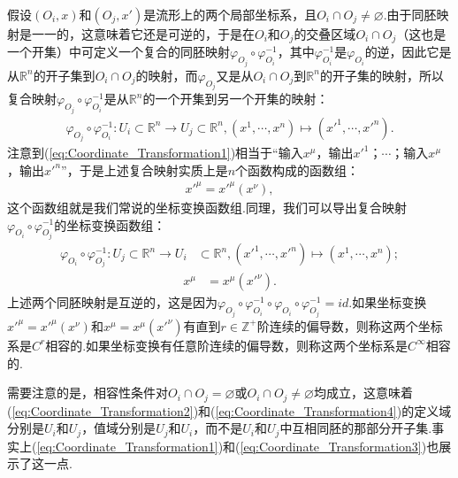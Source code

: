 	假设$(O_i,x)$和$(O_j,x')$是流形上的两个局部坐标系，且$O_i\cap O_j\neq \varnothing$.由于同胚映射是一一的，这意味着它还是可逆的，于是在$O_i$和$O_j$的交叠区域$O_i\cap O_j$（这也是一个开集）中可定义一个复合的同胚映射$\varphi_{O_j}\circ \varphi^{-1}_{O_i}$，其中$\varphi^{-1}_{O_i}$是$\varphi_{O_i}$的逆，因此它是从$\mathbb{R}^n$的开子集到$O_i\cap O_j$的映射，而$\varphi_{O_j}$又是从$O_i\cap O_j$到$\mathbb{R}^n$的开子集的映射，所以复合映射$\varphi_{O_j}\circ \varphi^{-1}_{O_i}$是从$\mathbb{R}^n$的一个开集到另一个开集的映射：
	\begin{equation}\label{eq:Coordinate_Transformation1}
		\begin{split}
			\varphi_{O_j}\circ \varphi^{-1}_{O_i}:U_i\subset\mathbb{R}^n\rightarrow U_j\subset\mathbb{R}^n,(x^1,\cdots,x^n)\mapsto (x'^1,\cdots,x'^n).
		\end{split}
	\end{equation}
	注意到(\ref{eq:Coordinate_Transformation1})相当于“输入$x^\mu$，输出$x'^1$；$\cdots$；输入$x^\mu$，输出$x'^n$”，于是上述复合映射实质上是$n$个函数构成的函数组：
	\begin{equation}\label{eq:Coordinate_Transformation2}
		\begin{split}
			x'^\mu=x'^\mu(x^\nu),
		\end{split}
	\end{equation}
	这个函数组就是我们常说的坐标变换函数组.同理，我们可以导出复合映射$\varphi_{O_i}\circ \varphi^{-1}_{O_j}$的坐标变换函数组：
	\begin{equation}\label{eq:Coordinate_Transformation3}
		\begin{split}
			\varphi_{O_i}\circ \varphi^{-1}_{O_j}:U_j\subset\mathbb{R}^n\rightarrow U_i&\subset\mathbb{R}^n,(x'^1,\cdots,x'^n)\mapsto (x^1,\cdots,x^n);
		\end{split}
	\end{equation}
	\begin{equation}\label{eq:Coordinate_Transformation4}
		\begin{split}
			x^\mu&=x^\mu(x'^\nu).
		\end{split}
	\end{equation}
	上述两个同胚映射是互逆的，这是因为$\varphi_{O_j}\circ \varphi^{-1}_{O_i}\circ \varphi_{O_i}\circ \varphi^{-1}_{O_j}=id$.如果坐标变换$x'^\mu=x'^\mu(x^\nu)$和$x^\mu=x^\mu(x'^\nu)$有直到$r\in\mathbb{Z}^+$阶连续的偏导数，则称这两个坐标系是$C^r$相容的.如果坐标变换有任意阶连续的偏导数，则称这两个坐标系是$C^\infty$相容的.
	\begin{remark}
		需要注意的是，相容性条件对$O_i\cap O_j=\varnothing$或$O_i\cap O_j\neq \varnothing$均成立，这意味着(\ref{eq:Coordinate_Transformation2})和(\ref{eq:Coordinate_Transformation4})的定义域分别是$U_i$和$U_j$，值域分别是$U_j$和$U_i$，而不是$U_i$和$U_j$中互相同胚的那部分开子集.事实上(\ref{eq:Coordinate_Transformation1})和(\ref{eq:Coordinate_Transformation3})也展示了这一点.
	\end{remark}
	
